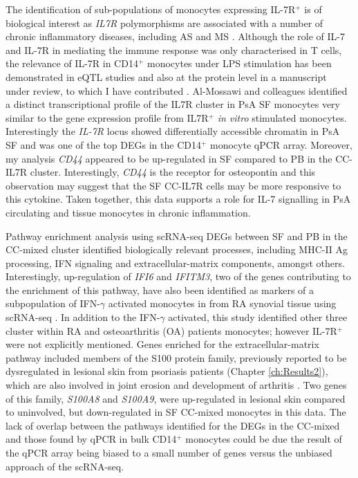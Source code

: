 The identification of sub-populations of monocytes expressing IL-7R$^+$ is of biological interest as \textit{IL7R} polymorphisms are associated with a number of chronic inflammatory diseases, including AS and MS \parencite{Gregory2007, Cortes2007}. Although the role of IL-7 and IL-7R in mediating the immune response was only characterised in T cells, the relevance of IL-7R in CD14$^+$ monocytes under LPS stimulation has been demonstrated in eQTL studies and also at the protein level in a manuscript under review, to which I have contributed \parencite{Fairfax2014, Al-Mossawi2018}. Al-Mossawi and colleagues identified a distinct transcriptional profile of the IL7R cluster in PsA SF monocytes very similar to the gene expression profile from IL7R$^+$ \textit{in vitro} stimulated monocytes. Interestingly the \textit{IL-7R} locus showed differentially accessible chromatin in PsA SF and was one of the top DEGs in the CD14$^+$ monocyte qPCR array. Moreover, my analysis \textit{CD44} appeared to be up-regulated in SF compared to PB in the CC-IL7R cluster. Interestingly, \textit{CD44} is the receptor for osteopontin and this observation may suggest that the SF CC-IL7R cells may be more responsive to this cytokine. Taken together, this data supports a role for IL-7 signalling in PsA circulating and tissue monocytes in chronic inflammation.

Pathway enrichment analysis using scRNA-seq DEGs between SF and PB in the CC-mixed cluster identified biologically relevant processes, including MHC-II Ag processing, IFN signaling and extracellular-matrix components, amongst others. Interestingly, up-regulation of \textit{IFI6} and \textit{IFITM3}, two of the genes contributing to the enrichment of this pathway, have also been identified as markers of a subpopulation of IFN-$\gamma$ activated monocytes in from RA synovial tissue using scRNA-seq \parencite{Zhang2018}. In addition to the IFN-$\gamma$ activated, this study identified other three cluster within RA and osteoarthritis (OA) patients monocytes; however IL-7R$^+$ were not explicitly mentioned. Genes enriched for the extracellular-matrix pathway included members of the S100 protein family, previously reported to be dysregulated in lesional skin from psoriasis patients (Chapter \ref{ch:Results2}), which are also involved in joint erosion and development of arthritis \parencite{Raghunatha2012}. Two genes of this family, \textit{S100A8} and \textit{S100A9}, were up-regulated in lesional skin compared to uninvolved, but down-regulated in SF CC-mixed monocytes in this data.  The lack of overlap between the pathways identified for the DEGs in the CC-mixed and those found by qPCR in bulk CD14$^+$ monocytes could be due the result of the qPCR array being biased to a small number of genes versus the unbiased approach of the scRNA-seq.

